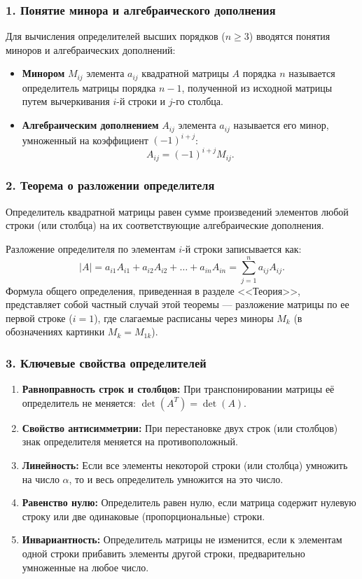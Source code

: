 \documentclass[12pt,a4paper]{article}
\begin{document}
\subsubsection*{1. Понятие минора и алгебраического дополнения}

Для вычисления определителей высших порядков ($n \ge 3$) вводятся понятия миноров и алгебраических дополнений:
\begin{itemize}
    \item \textbf{Минором} $M_{ij}$ элемента $a_{ij}$ квадратной матрицы $A$ порядка $n$ называется определитель матрицы порядка $n-1$, полученной из исходной матрицы путем вычеркивания $i$-й строки и $j$-го столбца.
    \item \textbf{Алгебраическим дополнением} $A_{ij}$ элемента $a_{ij}$ называется его минор, умноженный на коэффициент $(-1)^{i+j}$:
    \[
    A_{ij} = (-1)^{i+j} M_{ij}.
    \]
\end{itemize}

\subsubsection*{2. Теорема о разложении определителя}

Определитель квадратной матрицы равен сумме произведений элементов любой строки (или столбца) на их соответствующие алгебраические дополнения.

Разложение определителя по элементам $i$-й строки записывается как:
\[
|A| = a_{i1} A_{i1} + a_{i2} A_{i2} + \dots + a_{in} A_{in} = \sum_{j=1}^{n} a_{ij} A_{ij}.
\]
Формула общего определения, приведенная в разделе <<Теория>>, представляет собой частный случай этой теоремы --- разложение матрицы по ее первой строке ($i=1$), где слагаемые расписаны через миноры $M_k$ (в обозначениях картинки $M_k = M_{1k}$).

\subsubsection*{3. Ключевые свойства определителей}
\begin{enumerate}
    \item \textbf{Равноправность строк и столбцов:} При транспонировании матрицы её определитель не меняется: $\det(A^T) = \det(A)$.
    \item \textbf{Свойство антисимметрии:} При перестановке двух строк (или столбцов) знак определителя меняется на противоположный.
    \item \textbf{Линейность:} Если все элементы некоторой строки (или столбца) умножить на число $\alpha$, то и весь определитель умножится на это число.
    \item \textbf{Равенство нулю:} Определитель равен нулю, если матрица содержит нулевую строку или две одинаковые (пропорциональные) строки.
    \item \textbf{Инвариантность:} Определитель матрицы не изменится, если к элементам одной строки прибавить элементы другой строки, предварительно умноженные на любое число.
\end{enumerate}
\newpage
\end{document}

